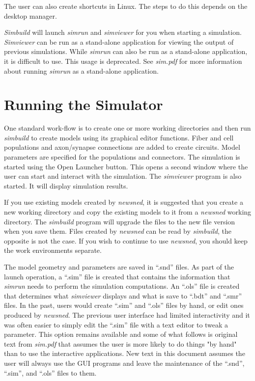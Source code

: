 \documentclass[12pt,openany,oneside]{book}
\newcommand{\prog}[1]{\textit{{#1}}}
\newcommand{\ext}[1]{{{``.#1''}}}
\begin{document}
The user can also create shortcuts in Linux. The steps to do this depends
on the desktop manager.

\prog{Simbuild} will launch \prog{simrun} and \prog{simviewer}
for you when starting a simulation. \prog{Simviewer} can be run as 
a stand-alone application for viewing the output of previous simulations.
While \prog{simrun} can also be run as a stand-alone application, it
is difficult to use. This usage is deprecated. See \prog{sim.pdf} for more 
information about running \prog{simrun} as a stand-alone application.

\chapter{Running the Simulator}

One standard work-flow  is to create one or more working
directories and then run \prog{simbuild} to create
models using its
graphical editor functions. Fiber and cell populations and axon/synapse
connections are added to create circuits. Model parameters are specified
for the populations and connectors. The simulation is started using the
Open Launcher button. This opens a second window where the user can start
and interact with the simulation. The \prog{simviewer} program is also
started. It will display simulation results.

If you use existing models created by \prog{newsned}, it is
suggested that you create a new working directory and copy
the existing models to it from a \prog{newsned} working directory.
The \prog{simbuild} program will upgrade the files to the new file
version when you save them. Files created by \prog{newsned} can be 
read by \prog{simbuild}, the opposite is not the case. If you wish to 
continue to use \prog{newsned}, you should keep the work environments
separate.

The model geometry and parameters are saved in \ext{snd} 
files. As part of the launch operation, a \ext{sim}  file
is created that contains the information that \prog{simrun} needs to
perform the simulation computations. An \ext{ols} file 
is created that determines what \prog{simviewer} displays and what is save
to \ext{bdt} and \ext{smr} files. In the past, users would create
\ext{sim} and \ext{ols} files by hand, or edit ones produced by
\prog{newsned}. The previous user interface had limited interactivity and
it was often easier to simply edit the \ext{sim} file with a text editor
to tweak a parameter. This option remains available and some of what
follows is original text from \textit{sim.pdf} that assumes the user is
more likely to do things "by hand" than to use the interactive
applications. New text in this document assumes the user will always use
the GUI programs and leave the maintenance of the \ext{snd}, \ext{sim},
and \ext{ols} files to them.
\end{document}
